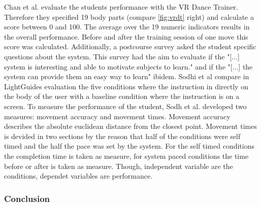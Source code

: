 Chan et al. evaluate the students performance with the VR Dance Trainer. Therefore they specified 19 body parts (compare \ref{fig:vrdt} right) and calculate a score between 0 and 100. The average over the 19 numeric indicators results in the overall performance. Before and after the training session of one move this score was calculated. Additionally, a postcourse survey asked the student specific questions about the system. This survey had the aim to evaluate if the "[...] system is interesting and able to motivate subjects to learn." \cite{Chan2011} and if the "[...] the system can provide them an easy way to learn" ibidem.
Sodhi et al \cite{Sodhi2012} compare in LightGuides evaluation the five conditions where the instruction in directly on the body of the user with a baseline condition where the instruction is on a screen. To measure the performance of the student, Sodh et al. developed two measures: movement accuracy and movement times. Movement accuracy describes the absolute euclidean distance from the closest point. Movement times is devided in two sections by the reason that half of the conditions were self timed and the half the pace was set by the system. For the self timed conditions the completion time is taken as measure, for system paced conditions the time before or after is taken as measure. Though, independent variable are the conditions, dependet variables are performance.

\subsubsection{Conclusion}

